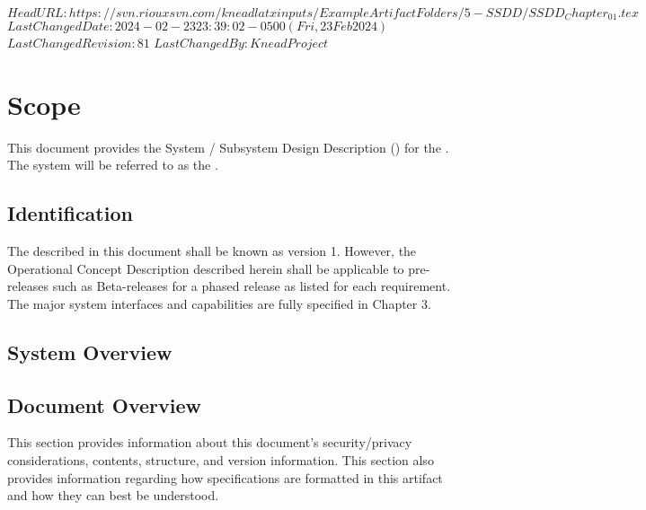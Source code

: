 \svnidlong
{$HeadURL: https://svn.riouxsvn.com/kneadlatxinputs/ExampleArtifactFolders/5-SSDD/SSDD_Chapter_01.tex $}
{$LastChangedDate: 2024-02-23 23:39:02 -0500 (Fri, 23 Feb 2024) $}
{$LastChangedRevision: 81 $}
{$LastChangedBy: KneadProject $}

\chapter{Scope}
\label{loc:Scope}
% 

This document provides the System / Subsystem Design Description (\SSDD) for the \ThisSystem. 
The system will be referred to as the \ThisSys.

\section{Identification}
\label{loc:Identification}
% 

The \ThisSystem described in this document shall be known as \ThisSys version 1.
However, the Operational Concept Description {\OCD} described herein shall be applicable to pre-releases such as Beta-releases for a phased release as listed for each requirement.
The major system interfaces and capabilities are fully specified in Chapter 3.

\section{System Overview}
\label{loc:SystemOverview}
% 



\newpage
\section{Document Overview}
\label{loc:DocumentOverview}
% 

This section provides information about this document's security/privacy considerations, contents, structure, and version information.
This section also provides information regarding how specifications are formatted in this artifact and how they can best be understood.







